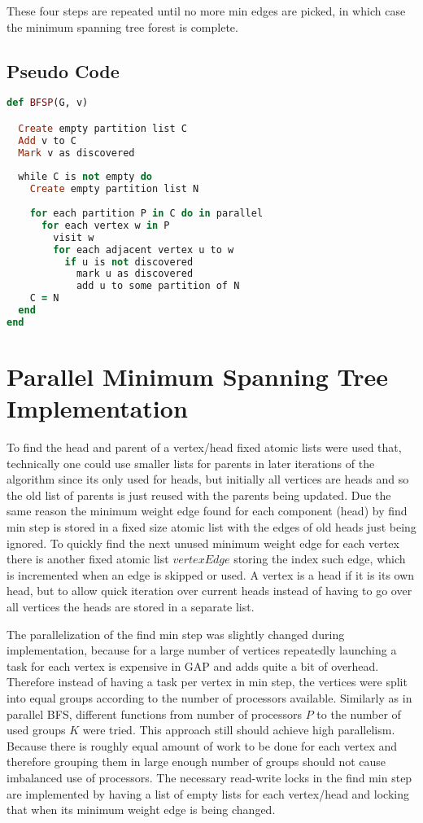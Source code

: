 \documentclass{report}
\theoremstyle{plain}
\theoremstyle{definition}
\theoremstyle{remark}
\begin{document}
These four steps are repeated until no more min edges are picked, in which case the minimum spanning tree forest is complete.

\subsection*{Pseudo Code} 
\begin{lstlisting}[language=Ruby]
def BFSP(G, v)

  Create empty partition list C
  Add v to C
  Mark v as discovered
  
  while C is not empty do
    Create empty partition list N
  	
    for each partition P in C do in parallel
      for each vertex w in P
        visit w
        for each adjacent vertex u to w
          if u is not discovered  	      
            mark u as discovered
            add u to some partition of N
    C = N
  end
end
\end{lstlisting}

\section{Parallel Minimum Spanning Tree Implementation}

To find the head and parent of a vertex/head fixed atomic lists were used that, technically one could use smaller lists for parents in later iterations of the algorithm since its only used for heads, but initially all vertices are heads and so the old list of parents is just reused with the parents being updated. Due the same reason the minimum weight edge found for each component (head) by find min step is stored in a fixed size atomic list with the edges of old heads just being ignored. To quickly find the next unused minimum weight edge for each vertex there is another fixed atomic list $vertexEdge$ storing the index such edge, which is incremented when an edge is skipped or used. A vertex is a head if it is its own head, but to allow quick iteration over current heads instead of having to go over all vertices the heads are stored in a separate list.

The parallelization of the find min step was slightly changed during implementation, because for a large number of vertices repeatedly launching a task for each vertex is expensive in GAP and adds quite a bit of overhead. Therefore instead of having a task per vertex in min step, the vertices were split into equal groups according to the number of processors available. Similarly as in parallel BFS, different functions from number of processors $P$ to the number of used groups $K$ were tried.
This approach still should achieve high parallelism. Because there is roughly equal amount of work to be done for each vertex and therefore grouping them in large enough number of groups should not cause imbalanced use of processors. 
The necessary read-write locks in the find min step are implemented by having a list of empty lists for each vertex/head and locking that when its minimum weight edge is being changed.
\end{document}
